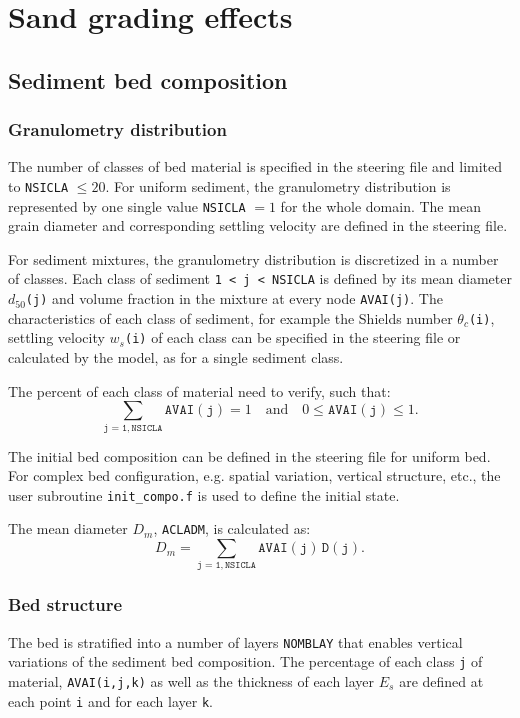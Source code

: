 \section{Sand grading effects}\label{ch:sandgrading}
\subsection{Sediment bed composition}

\subsubsection{Granulometry distribution}
The number of classes of bed material is specified in the steering file and
limited to \texttt{NSICLA} $\leq 20$. For uniform sediment, the granulometry distribution is represented by one
single value \texttt{NSICLA} $= 1$ for the whole domain. The mean grain diameter and
corresponding settling velocity are defined in the steering file. 

For sediment mixtures, the granulometry distribution is discretized in a
number of classes. Each class of sediment \texttt{1 < j < NSICLA} is defined by its mean diameter $d_{50}$\texttt{(j)} and volume fraction in the mixture at every node \texttt{AVAI(j)}. The characteristics of each class
of sediment, for example the Shields number $\theta_c$\texttt{(i)}, settling
velocity $w_s$\texttt{(i)} of each class can be specified in the steering file
or calculated by the model, as for a single sediment class. 

The percent of each class of material need to verify, such that:
\begin{equation}\label{eq:percentclass}
\sum_{\mathtt{j=1,NSICLA}} \mathtt{AVAI(j)} = 1 \quad \text{and} \quad 0\leq \mathtt{AVAI(j)} \leq 1. 
\end{equation}

The initial bed composition can be defined in the steering file for uniform bed. 
For complex bed configuration, e.g. spatial
variation, vertical structure, etc., the user subroutine \texttt{init\_compo.f} is used to define the initial state.

The mean diameter $D_m$, \texttt{ACLADM}, is calculated as:
\begin{equation}\label{eq:d50class}
D_m = \sum_{\mathtt{j=1,NSICLA}} \mathtt{AVAI(j)\,D(j)}. 
\end{equation}

\subsubsection{Bed structure}
The bed is stratified into a number of layers \texttt{NOMBLAY} that enables
vertical variations of the sediment bed composition. The percentage of each
class \texttt{j} of material, \texttt{AVAI(i,j,k)} as well as the thickness of each
layer $E_s$ are defined at each point \texttt{i} and for each layer \texttt{k}. 

